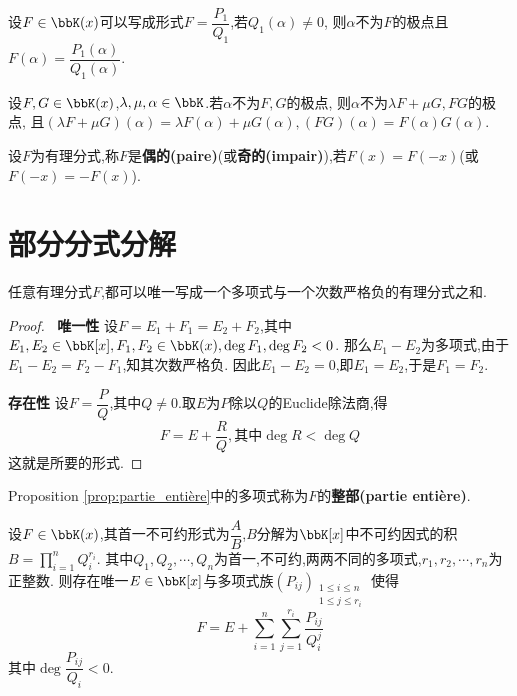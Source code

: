 \begin{rqq}
    设$F \in \bbK(x)$可以写成形式$F = \dfrac{P_1}{Q_1}$,若$Q_1(\alpha) \neq 0$,
    则$\alpha$不为$F$的极点且$F(\alpha) = \dfrac{P_1(\alpha)}{Q_1(\alpha)}$.
\end{rqq}

\begin{rqq}
    设$F, G \in \bbK(x)$,$\lambda, \mu, \alpha \in \bbK$.若$\alpha$不为$F, G$的极点,
    则$\alpha$不为$\lambda F + \mu G, FG$的极点,
    且$(\lambda F + \mu G)(\alpha) = \lambda F(\alpha) + \mu G(\alpha), (FG)(\alpha) = F(\alpha) G(\alpha)$.
\end{rqq}

\begin{deff}
    设$F$为有理分式,称$F$是\textbf{偶的(paire)}(或\textbf{奇的(impair)}),若$F(x) = F(-x)$(或$F(-x) = -F(x)$).
\end{deff}

\section{部分分式分解}

\begin{prop} \label{prop:partie_entière}
    任意有理分式$F$,都可以唯一写成一个多项式与一个次数严格负的有理分式之和.
\end{prop}

\begin{proof} $\ $
    \textbf{唯一性} \quad 设$F = E_1 + F_1 = E_2 + F_2$,其中$E_1, E_2 \in \bbK[x], F_1, F_2 \in \bbK(x), \deg F_1, \deg F_2 < 0$.
        那么$E_1 - E_2$为多项式,由于$E_1 - E_2 = F_2 - F_1$,知其次数严格负.
        因此$E_1 - E_2 = 0$,即$E_1 = E_2$,于是$F_1 = F_2$.

    \textbf{存在性} \quad 设$F = \dfrac{P}{Q}$,其中$Q \neq 0$.取$E$为$P$除以$Q$的Euclide除法商,得
        \[ F = E + \dfrac{R}{Q}, \text{其中} \deg R < \deg Q \]
        这就是所要的形式.
\end{proof}

\begin{rqq}
    Proposition \ref{prop:partie_entière}中的多项式称为$F$的\textbf{整部(partie entière)}.
\end{rqq}

\begin{thm} \label{thm:décomposition_en_éléments_simples}
    设$F \in \bbK(x)$,其首一不可约形式为$\dfrac{A}{B}$,$B$分解为$\bbK[x]$中不可约因式的积$B = \prod\limits_{i = 1}^n Q_i^{r_i}$.
    其中$Q_1, Q_2, \cdots, Q_n$为首一,不可约,两两不同的多项式,$r_1, r_2, \cdots, r_n$为正整数.
    则存在唯一$E \in \bbK[x]$与多项式族$(P_{ij})_{\substack{1 \leqslant i \leqslant n \\ 1 \leqslant j \leqslant r_i}}$
    使得\[ F = E + \sum\limits_{i = 1}^n \sum\limits_{j = 1}^{r_i} \dfrac{P_{ij}}{Q_i^j} \]
    其中$\deg \dfrac{P_{ij}}{Q_i} < 0$.
\end{thm}

